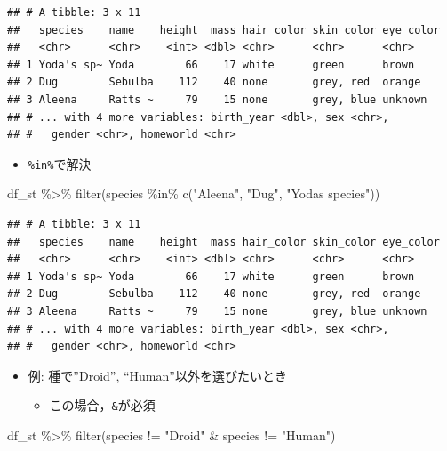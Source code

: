 \documentclass[
  xelatex,ja=standard, b5paper]{bxjsbook}
\newenvironment{Shaded}{\begin{snugshade}}{\end{snugshade}}
\newcommand{\FunctionTok}[1]{\textcolor[rgb]{0.00,0.00,0.00}{#1}}
\newcommand{\NormalTok}[1]{#1}
\newcommand{\SpecialCharTok}[1]{\textcolor[rgb]{0.00,0.00,0.00}{#1}}
\newcommand{\StringTok}[1]{\textcolor[rgb]{0.31,0.60,0.02}{#1}}
\providecommand{\tightlist}{%
  \setlength{\itemsep}{0pt}\setlength{\parskip}{0pt}}
\begin{document}
\begin{verbatim}
## # A tibble: 3 x 11
##   species    name    height  mass hair_color skin_color eye_color
##   <chr>      <chr>    <int> <dbl> <chr>      <chr>      <chr>    
## 1 Yoda's sp~ Yoda        66    17 white      green      brown    
## 2 Dug        Sebulba    112    40 none       grey, red  orange   
## 3 Aleena     Ratts ~     79    15 none       grey, blue unknown  
## # ... with 4 more variables: birth_year <dbl>, sex <chr>,
## #   gender <chr>, homeworld <chr>
\end{verbatim}

\begin{itemize}
\tightlist
\item
  \texttt{\%in\%}で解決
\end{itemize}

\begin{Shaded}
\begin{Highlighting}[]
\NormalTok{df\_st }\SpecialCharTok{\%\textgreater{}\%} 
  \FunctionTok{filter}\NormalTok{(species }\SpecialCharTok{\%in\%} \FunctionTok{c}\NormalTok{(}\StringTok{"Aleena"}\NormalTok{, }\StringTok{"Dug"}\NormalTok{, }\StringTok{"Yoda\textquotesingle{}s species"}\NormalTok{))}
\end{Highlighting}
\end{Shaded}

\begin{verbatim}
## # A tibble: 3 x 11
##   species    name    height  mass hair_color skin_color eye_color
##   <chr>      <chr>    <int> <dbl> <chr>      <chr>      <chr>    
## 1 Yoda's sp~ Yoda        66    17 white      green      brown    
## 2 Dug        Sebulba    112    40 none       grey, red  orange   
## 3 Aleena     Ratts ~     79    15 none       grey, blue unknown  
## # ... with 4 more variables: birth_year <dbl>, sex <chr>,
## #   gender <chr>, homeworld <chr>
\end{verbatim}

\begin{itemize}
\tightlist
\item
  例: 種で''Droid'', ``Human''以外を選びたいとき

  \begin{itemize}
  \tightlist
  \item
    この場合，\texttt{\&}が必須
  \end{itemize}
\end{itemize}

\begin{Shaded}
\begin{Highlighting}[]
\NormalTok{df\_st }\SpecialCharTok{\%\textgreater{}\%} 
  \FunctionTok{filter}\NormalTok{(species }\SpecialCharTok{!=} \StringTok{"Droid"} \SpecialCharTok{\&}\NormalTok{ species }\SpecialCharTok{!=} \StringTok{"Human"}\NormalTok{)}
\end{Highlighting}
\end{Shaded}
\end{document}
